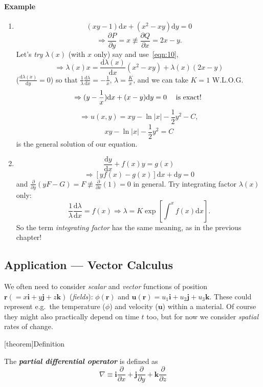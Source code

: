 \documentclass[12pt]{report}
\theoremstyle{definition}
\begin{document}
\paragraph{Example}
\begin{enumerate}[label = (\arabic*)]
    \item 
\[
    (xy-1)\mathrm{d}x + (x^{2}-xy)\mathrm{d}y = 0
\]\[
    \Rightarrow{}\frac{\partial P}{\partial y} = x 
    \not\equiv \frac{\partial Q}{\partial x} = 2x-y.
\]
Let's \emph{try} $\lambda(x)$ (with $x$ only) say and use~\eqref{eqn:10},\[
    \Rightarrow{} \lambda(x)x = \frac{\mathrm{d}\lambda(x)}{\mathrm{d}x} (x^{2}-xy) + \lambda(x)(2x-y)
\]($\frac{\mathrm{d}\lambda(x)}{\mathrm{d}y} = 0$) so that 
$\frac{1}{\lambda} \frac{\mathrm{d}\lambda}{\mathrm{d}x} = -\frac{1}{x}$, 
$\lambda = \frac{K}{x}$,
and we can take $K = 1$ W.L.O.G.\[
\Rightarrow{}(y-\frac{1}{x})\mathrm{d}x + (x-y)\mathrm{d}y = 0 \quad\;\textnormal{is exact!}\;
\]\[
\Rightarrow{}u(x,y) = xy - \ln{|x|} - \frac{1}{2}y^{2} - C,
\]\[
xy - \ln{|x|} - \frac{1}{2}y^{2} = C
\]is the general solution of our equation.

\item \[
        \frac{\mathrm{d}y}{\mathrm{d}x} + f(x)y = g(x)
\]\[
\Rightarrow{}[yf(x) - g(x)]\mathrm{d}x + \mathrm{d}y = 0
\]and $\frac{\partial}{\partial y} (yF-G) = F \not\equiv \frac{\partial}{\partial x} (1) = 0$ in general.
Try integrating factor $\lambda(x)$ only:\[
    \frac{1}{\lambda} \frac{\mathrm{d} \lambda}{\mathrm{d}x} = f(x)
    \Rightarrow{}\lambda = K \exp{\left[\int_{}^{x} f(x)\mathrm{d}x\right]}.
\]
So the term \emph{integrating factor} has the same meaning, as in the previous chapter!
\end{enumerate}

\subsection{Application --- Vector Calculus}

We often need to consider \emph{scalar} and \emph{vector} functions of position
$\pmb{r} (= x\pmb{i} + y\pmb{j} + z\pmb{k})$ (\emph{fields}): 
$\phi(\pmb{r})$ and $\pmb{u}(\pmb{r}) = u_1\pmb{i} + u_2\pmb{j} + u_3\pmb{k}$.
These could represent e.g.\ the temperature ($\phi$) and velocity ($\pmb{u}$) within a material.
Of course they might also practically depend on time $t$ too, but for now
we consider \emph{spatial} rates of change.

[theorem]{Definition}
\begin{partial differential operator}
The \textbf{\emph{partial differential operator}} is defined as\[
    \nabla \equiv \pmb{i}\frac{\partial}{\partial x} + \pmb{j}\frac{\partial}{\partial y} + \pmb{k}\frac{\partial}{\partial z}
\]
\end{partial differential operator}
\end{document}
